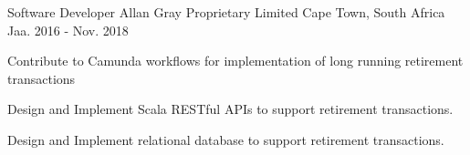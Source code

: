 \begin{cventries}
  \cventry
    {Software Developer} %
    {Allan Gray Proprietary Limited} %
    {Cape Town, South Africa} %
    {Jaa. 2016 - Nov. 2018} %
    {
      \begin{cvitems} %
        \item {Contribute to Camunda workflows for implementation of long running retirement transactions}
        \item {Design and Implement Scala RESTful APIs to support retirement transactions.} 
        \item {Design and Implement relational database to support retirement transactions.} 
      \end{cvitems}
    }
\end{cventries}


